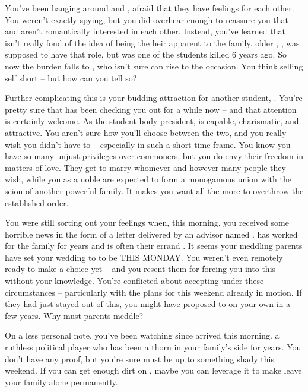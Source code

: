 \documentclass[char]{GL2020}
\begin{document}
You've been hanging around \cHeir{} and \cAmbition{}, afraid that they have feelings for each other. You weren't exactly spying, but you did overhear enough to reassure you that \cAmbition{} and \cHeir{} aren't romantically interested in each other. Instead, you've learned that \cHeir{} isn't really fond of the idea of being the heir apparent to the \cHeir{\formal} family. \cHeir{\Their} older \cHeirSibling{\sibling}, \cHeirSibling{}, was supposed to have that role, but \cHeirSibling{} was one of the students killed 6 years ago. So now the burden falls to \cHeir{}, who isn't sure \cHeir{\they} can rise to the occasion. You think \cHeir{\theyare} selling \cHeir{\them}self short -- but how can you tell \cHeir{\them} so?

Further complicating this is your budding attraction for another student, \cPresident{}. You're pretty sure that \cPresident{} has been checking you out for a while now -- and that attention is certainly welcome. As the student body president, \cPresident{} is capable, charismatic, and attractive. You aren't sure how you'll choose between the two, and you really wish you didn't have to -- especially in such a short time-frame. You know you have so many unjust privileges over commoners, but you do envy their freedom in matters of love. They get to marry whomever and however many people they wish, while you as a noble are expected to form a monogamous union with the scion of another powerful family. It makes you want all the more to overthrow the established order.

You were still sorting out your feelings when, this morning, you received some horrible news in the form of a letter delivered by an advisor named \cDiplomat{\full}. \cDiplomat{} has worked for the \cHeir{\formal} family for years and is often their errand \cDiplomat{\kid}. It seems your meddling parents have set your wedding to \cHeir{} to be THIS MONDAY. You weren't even remotely ready to make a choice yet -- and you resent them for forcing you into this without your knowledge. You're conflicted about accepting under these circumstances -- particularly with the \pGoaties{} plans for this weekend already in motion. If they had just stayed out of this, you might have proposed to \cHeir{} on your own in a few years. Why must parents meddle?
 
On a less personal note, you've been watching \cEvil{\full} since \cEvil{\they} arrived this morning. \cEvil{\Theyare} a ruthless political player who has been a thorn in your family's side for years. You don't have any proof, but you're sure \cEvil{\they} must be up to something shady this weekend. If you can get enough dirt on \cEvil{\them}, maybe you can leverage it to make \cEvil{\them} leave your family alone permanently. 
 
\end{document}

